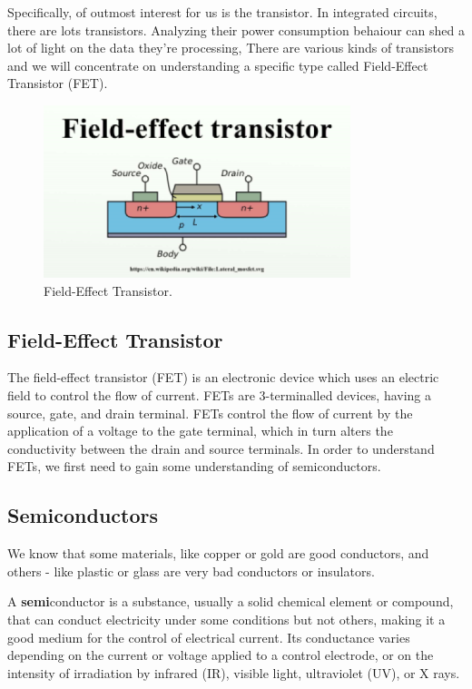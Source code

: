 Specifically, of outmost interest for us is the transistor. 
In integrated circuits, there are lots transistors. Analyzing their power consumption behaiour can
shed a lot of light on the data they're processing,
There are various kinds of transistors and we will concentrate on understanding a
specific type called Field-Effect Transistor (FET).

\begin{figure}[!ht]
	\centering
	\includegraphics{images/field_effect_transistor.png}
	\caption{Field-Effect Transistor.} \label{fig:field_effect_transistor}
\end{figure}

\subsection{Field-Effect Transistor}

The field-effect transistor (FET) is an electronic device which uses an electric
field to control the flow of current. FETs are 3-terminalled devices, having a
source, gate, and drain terminal. FETs control the flow of current by the
application of a voltage to the gate terminal, which in turn alters the
conductivity between the drain and source terminals. In order to understand FETs,
we first need to gain some understanding of semiconductors.

\subsection{Semiconductors}

We know that some materials, like copper or gold are good conductors, and others - like plastic or glass are very bad conductors or insulators. 

A \textbf{semi}conductor is a substance, usually a solid chemical element or compound,
that can conduct electricity under some conditions but not others, making it a
good medium for the control of electrical current. Its conductance varies
depending on the current or voltage applied to a control electrode, or on the
intensity of irradiation by infrared (IR), visible light, ultraviolet (UV), or X
rays.

